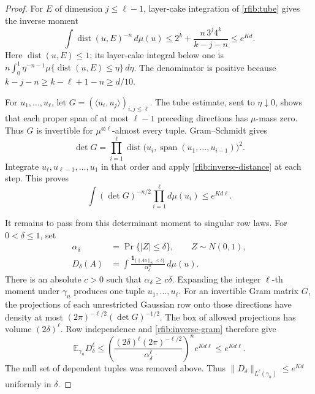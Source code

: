 \begin{proof}
For \(E\) of dimension \(j\le\ell-1\), layer-cake integration of
\eqref{rfib:tube} gives the inverse moment
\begin{equation}\label{rfib:inverse-distance}
 \int\operatorname{dist}(u,E)^{-n}\,d\mu(u)
 \le2^k+\frac{n\,3^j4^k}{k-j-n}\le e^{Kd}.
\end{equation}
Here \(\operatorname{dist}(u,E)\le1\); its layer-cake integral below
one is \(n\int_0^1\eta^{-n-1}
\mu\{\operatorname{dist}(u,E)\le\eta\}\,d\eta\).
The denominator is positive because
\(k-j-n\ge k-\ell+1-n\ge d/10\).

For \(u_1,\ldots,u_\ell\), let
\(G=(\langle u_i,u_j\rangle)_{i,j\le\ell}\).
The tube estimate, sent to \(\eta\downarrow0\), shows that each
proper span of at most \(\ell-1\) preceding directions has
\(\mu\)-mass zero.  Thus \(G\) is invertible for
\(\mu^{\otimes\ell}\)-almost every tuple.  Gram--Schmidt gives
\[
 \det G=\prod_{i=1}^{\ell}
 \operatorname{dist}\bigl(u_i,\operatorname{span}(u_1,\ldots,u_{i-1})
                    \bigr)^2 .
\]
Integrate \(u_\ell,u_{\ell-1},\ldots,u_1\) in that order and apply
\eqref{rfib:inverse-distance} at each step.  This proves
\begin{equation}\label{rfib:inverse-gram}
 \int(\det G)^{-n/2}\prod_{i=1}^{\ell}d\mu(u_i)
 \le e^{Kd\ell}.
\end{equation}

It remains to pass from this determinant moment to singular row laws.
For \(0<\delta\le1\), set
\[
 \begin{aligned}
 \alpha_\delta&=\Pr\{|Z|\le\delta\},\qquad Z\sim N(0,1),\\
 D_\delta(A)&=\int
 \frac{\mathbf 1_{\{\|Au\|_\infty\le\delta\}}}{\alpha_\delta^n}
 \,d\mu(u).
 \end{aligned}
\]
There is an absolute \(c>0\) such that \(\alpha_\delta\ge c\delta\).
Expanding the integer \(\ell\)-th moment under \(\gamma_n\) produces
one tuple \(u_1,\ldots,u_\ell\).  For an invertible Gram matrix \(G\),
the projections of each unrestricted Gaussian row onto those directions
have density at most
\((2\pi)^{-\ell/2}(\det G)^{-1/2}\).  The box of allowed projections
has volume \((2\delta)^\ell\).  Row independence and
\eqref{rfib:inverse-gram} therefore give
\[
 \mathbb E_{\gamma_n}D_\delta^\ell
 \le
 \left(\frac{(2\delta)^\ell(2\pi)^{-\ell/2}}
             {\alpha_\delta^\ell}\right)^n e^{Kd\ell}
 \le e^{Kd\ell}.
\]
The null set of dependent tuples was removed above.  Thus
\(\|D_\delta\|_{L^\ell(\gamma_n)}\le e^{Kd}\) uniformly in
\(\delta\).


\end{proof}
